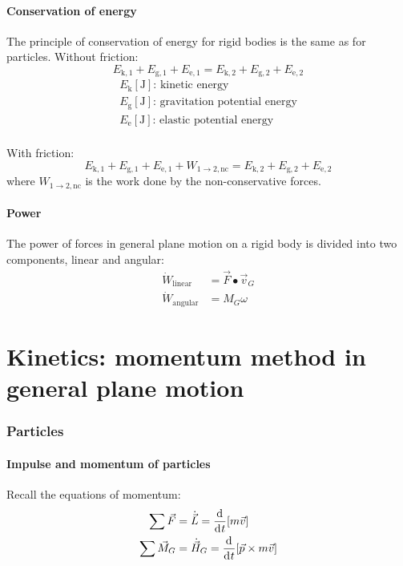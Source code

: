 \documentclass[10pt, twocolumn]{article}
\begin{document}
\subsection{Conservation of energy}
The principle of conservation of energy for rigid bodies is the same as for particles.
Without friction:
\[
  E_\mathrm{k,1} + E_\mathrm{g,1} + E_\mathrm{e,1} = E_\mathrm{k,2} + E_\mathrm{g,2} + E_\mathrm{e,2}
\]
\[
  \begin{array}{|l}
    E_\mathrm{k} [\si{\joule}] \text{: kinetic energy}               \\
    E_\mathrm{g} [\si{\joule}] \text{: gravitation potential energy} \\
    E_\mathrm{e} [\si{\joule}] \text{: elastic potential energy}     \\
  \end{array}
\]

With friction:
\[
  E_\mathrm{k,1} + E_\mathrm{g,1} + E_\mathrm{e,1} + W_\mathrm{1 \to 2, nc} = E_\mathrm{k,2} + E_\mathrm{g,2} + E_\mathrm{e,2}
\]
where \(W_\mathrm{1 \to 2, nc}\) is the work done by the non-conservative forces.


\subsection{Power}
The power of forces in general plane motion on a rigid body is divided into two components, linear and angular:
\begin{align*}
  \dot{W}_\mathrm{linear}  & = \vec{F} \bullet \vec{v}_G \\
  \dot{W}_\mathrm{angular} & = M_G \omega
\end{align*}


\part{Kinetics: momentum method in general plane motion}
\section{Particles}
\subsection{Impulse and momentum of particles}
Recall the equations of momentum:
\begin{align*}
  \sum{\vec{F}}   & = \dot{\vec{L}} = \frac{\mathrm{d}^{}}{\mathrm{d}^{} t}[m\vec{v}]                  \\
  \sum{\vec{M}_G} & = \dot{\vec{H}}_G = \frac{\mathrm{d}^{}}{\mathrm{d}^{} t}[\vec{p} \times m\vec{v}]
\end{align*}
\end{document}

